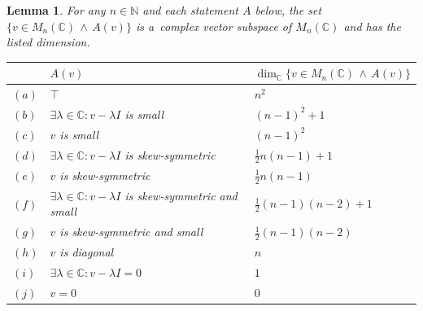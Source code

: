 \documentclass[10pt,a4paper]{amsart}
\numberwithin{equation}{section}
\newtheorem{Lemma}[Theorem]{Lemma}
\newcommand\Tstrut{\rule{0pt}{2.6ex}}
\newcommand{\identitymatrix}{I}
\newcommand{\Sand}{\,\wedge\,}
\newcommand{\Strue}{\top}
\newcommand{\quantorpredicate}{\colon }
\newcommand{\pint}{\mathbb{N}}
\newcommand{\comps}{\mathbb{C}}
\newcommand{\squarematrices}[2]{M_{#1}(#2)}
\newcommand{\onehalf}{{ \frac{1}{2}}}
\newcommand{\thedim}{n}
\begin{document}
{
  \newcommand{\somespace}{V}
  \newcommand{\themat}{v}
  \newcommand{\theshortpredicate}{A}
  \newcommand{\theshortpredicatex}[1]{\theshortpredicate(#1)}
    \newcommand{\thesum}{\lambda}
    \newcommand{\theid}{\identitymatrix}
    \begin{Lemma}
      \label{lemma:dimensions}
For any $\thedim\in\pint$ and each statement $\theshortpredicate$  below, the set $\{\themat\in\squarematrices{\thedim}{\comps}\Sand \theshortpredicatex{\themat}\}$ is a~complex vector subspace of $\squarematrices{\thedim}{\comps}$ and has the listed dimension.
    \begin{table}[h]\centering\renewcommand{\arraystretch}{1.2}
      \begin{tabular}{ll|l}
&        $\theshortpredicatex{\themat}$ & $\dim_\comps\{\themat\in\squarematrices{\thedim}{\comps}\Sand \theshortpredicatex{\themat}\}$\\[0.1em] \hline
$(a)$  &      $\Strue$& $\thedim^2$ \Tstrut\\
$(b)$ & $\exists \thesum\in\comps\quantorpredicate \themat-\thesum\theid$ is small                                  &$(\thedim-1)^2+1$ \\
$(c)$ & $\themat$ is small                                  &$(\thedim-1)^2$ \\
$(d)$ & $\exists \thesum\in\comps\quantorpredicate \themat-\thesum\theid$ is skew-symmetric                                  &$\onehalf\thedim(\thedim-1)+1$ \\
$(e)$ &              $\themat$ is skew-symmetric                    &$\onehalf\thedim(\thedim-1)$ \\
$(f)$ & $\exists \thesum\in\comps\quantorpredicate \themat-\thesum\theid$ is skew-symmetric and small                                  &$\onehalf(\thedim-1)(\thedim-2)+1$ \\
$(g)$ & $\themat$     is skew-symmetric and small                             &$\onehalf(\thedim-1)(\thedim-2)$ \\
$(h)$ &        $\themat$  is diagonal& $\thedim$ \\
$(i)$ & $\exists \thesum\in\comps\quantorpredicate \themat-\thesum\theid=0$                                 & $1$ \\
$(j)$ & $\themat=0$        & $0$
    \end{tabular}
    \end{table}
  \end{Lemma}

}
\end{document}
